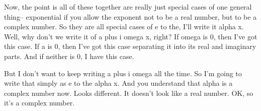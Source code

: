 Now, the point is all of these together
are really just special cases of one general thing--
exponential if you allow the exponent
not to be a real number, but to be a complex number.
So they are all special cases of e
to the, I'll write it alpha x.
Well, why don't we write it of a plus i omega x, right?
If omega is 0, then I've got this case.
If a is 0, then I've got this case
separating it into its real and imaginary parts.
And if neither is 0, I have this case.

But I don't want to keep writing a plus i omega all the time.
So I'm going to write that simply as e to the alpha x.
And you understand that alpha is a complex number now.
Looks different.
It doesn't look like a real number.
OK, so it's a complex number.
\clearpage
